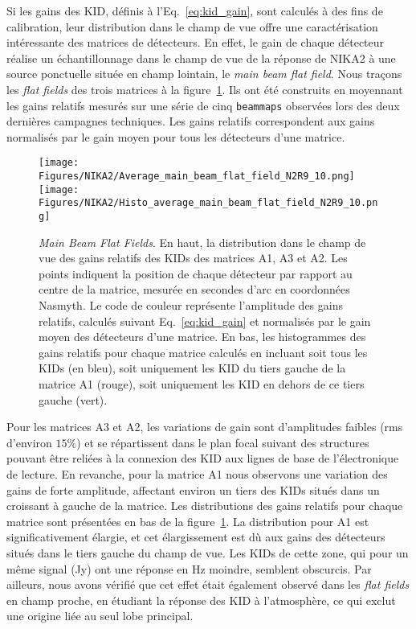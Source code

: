 Si les gains des KID, définis à l'Eq.~\ref{eq:kid_gain}, sont calculés
à des fins de calibration, leur distribution dans le champ de vue offre
une caractérisation intéressante des matrices de détecteurs. En effet,
le gain de chaque détecteur réalise un échantillonnage dans le champ
de vue de la réponse de NIKA2 à une source ponctuelle située en champ lointain, le
\emph{main beam flat field}. Nous traçons les \emph{flat fields} des
trois matrices à la figure~\ref{fig:avg_mbff}. Ils ont été construits
en moyennant les gains relatifs mesurés sur une série de cinq
{\tt beammaps} observées lors des deux dernières campagnes
techniques. Les gains relatifs correspondent aux gains normalisés par
le gain moyen pour tous les détecteurs d'une matrice. 
\begin{figure}[!thbp] 
\begin{center}
  \texttt{[image: Figures/NIKA2/Average\_main\_beam\_flat\_field\_N2R9\_10.png]}
  \texttt{[image: Figures/NIKA2/Histo\_average\_main\_beam\_flat\_field\_N2R9\_10.png]}
  \caption[Average main beam flat fields]{\emph{Main Beam Flat
      Fields}. En haut, la distribution dans le champ de vue des gains
    relatifs des KIDs des matrices A1, A3 et A2. Les points indiquent
    la position de chaque détecteur par rapport au centre de la
    matrice, mesurée en secondes d'arc en coordonnées Nasmyth. Le code
    de couleur représente l'amplitude des gains relatifs, calculés
    suivant Eq.~\ref{eq:kid_gain} et normalisés par le gain moyen des
    détecteurs d'une matrice. En bas, les histogrammes des gains
    relatifs pour chaque matrice calculés en incluant soit tous les KIDs
    (en bleu), soit uniquement les KID du tiers gauche de la matrice
    A1 (rouge), soit uniquement les KID en dehors de ce tiers gauche
    (vert).}
 \label{fig:avg_mbff}
\end{center}
\end{figure}
%
Pour les matrices A3 et A2, les variations de gain sont d'amplitudes
faibles (rms d'environ $15\%$) et se répartissent dans le plan
focal suivant des structures pouvant être reliées à la connexion des
KID aux lignes de base de l'électronique de lecture. En revanche, pour
la matrice A1 nous observons une variation des gains de forte
amplitude, affectant environ un tiers des KIDs situés dans un
croissant à gauche de la matrice. Les distributions des gains relatifs
pour chaque matrice sont présentées en bas de la
figure~\ref{fig:avg_mbff}. La distribution pour A1 est
significativement élargie, et cet élargissement est dù aux gains des
détecteurs situés dans le tiers gauche du champ de vue. Les KIDs de
cette zone, qui pour un même signal (Jy) ont une réponse en Hz
moindre, semblent obscurcis. Par ailleurs, nous avons vérifié que cet
effet était également observé dans les \emph{flat fields} en champ
proche, en étudiant la réponse des KID à l'atmosphère, ce qui exclut
une origine liée au seul lobe principal.

